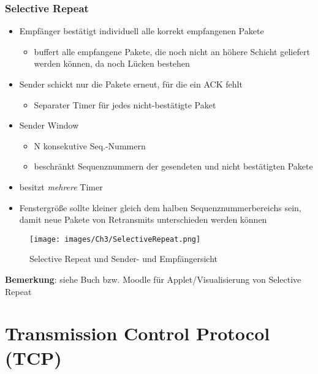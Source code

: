 \subsubsection{Selective Repeat}
\begin{itemize}
    \item Empfänger bestätigt individuell alle korrekt empfangenen Pakete
            \begin{itemize}
                \item buffert alle empfangene Pakete, die noch nicht an höhere Schicht geliefert werden können, da noch Lücken bestehen
            \end{itemize}
    \item Sender schickt nur die Pakete erneut, für die ein ACK fehlt
            \begin{itemize}
                \item Separater Timer für jedes nicht-bestätigte Paket
            \end{itemize}
    \item Sender Window
            \begin{itemize}
                \item N konsekutive Seq.-Nummern
                \item beschränkt Sequenznummern der gesendeten und nicht bestätigten Pakete
            \end{itemize}
    \item besitzt \emph{mehrere} Timer      
    
    \item Fenstergröße sollte kleiner gleich dem halben Sequenznummerbereichs sein, damit neue Pakete von Retransmits unterschieden werden können
\end{itemize}

\begin{figure}[H]
    \centering
    \texttt{[image: images/Ch3/SelectiveRepeat.png]}
    \caption{Selective Repeat und Sender- und Empfängersicht}
    \label{Ch03-SelectiveRepeat}
\end{figure}

\textbf{Bemerkung}: siehe Buch bzw. Moodle für Applet/Visualisierung von Selective Repeat


\section{Transmission Control Protocol (TCP)}
